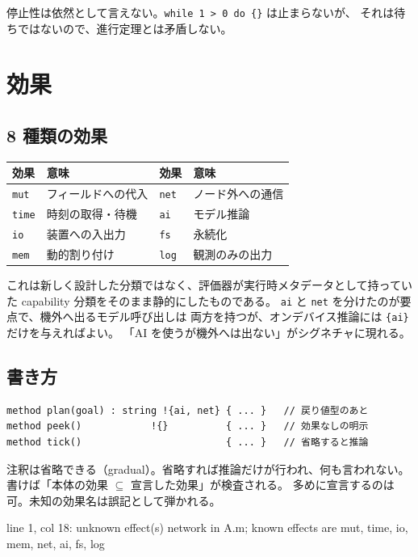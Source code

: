 \documentclass[11pt,a4paper]{ltjsarticle}
\newcommand{\eff}[1]{\texttt{\{#1\}}}
\begin{document}
停止性は依然として言えない。\texttt{while 1 > 0 do \{\}} は止まらないが、
それは待ちではないので、進行定理とは矛盾しない。

\section{効果}
\label{sec:effects}

\subsection{8 種類の効果}

\begin{center}
\begin{tabular}{@{}llll@{}}
\toprule
効果 & 意味 & 効果 & 意味 \\
\midrule
\texttt{mut}  & フィールドへの代入   & \texttt{net} & ノード外への通信 \\
\texttt{time} & 時刻の取得・待機     & \texttt{ai}  & モデル推論 \\
\texttt{io}   & 装置への入出力       & \texttt{fs}  & 永続化 \\
\texttt{mem}  & 動的割り付け         & \texttt{log} & 観測のみの出力 \\
\bottomrule
\end{tabular}
\end{center}

これは新しく設計した分類ではなく、評価器が実行時メタデータとして持っていた
capability 分類をそのまま静的にしたものである。
\texttt{ai} と \texttt{net} を分けたのが要点で、機外へ出るモデル呼び出しは
両方を持つが、オンデバイス推論には \eff{ai} だけを与えればよい。
「AI を使うが機外へは出ない」がシグネチャに現れる。

\subsection{書き方}

\begin{lstlisting}
method plan(goal) : string !{ai, net} { ... }   // 戻り値型のあと
method peek()            !{}          { ... }   // 効果なしの明示
method tick()                         { ... }   // 省略すると推論
\end{lstlisting}

注釈は省略できる（gradual）。省略すれば推論だけが行われ、何も言われない。
書けば「本体の効果 $\subseteq$ 宣言した効果」が検査される。
多めに宣言するのは可。未知の効果名は誤記として弾かれる。

\begin{term}
 line 1, col 18: unknown effect(s) network in A.m;
  known effects are mut, time, io, mem, net, ai, fs, log
\end{term}
\end{document}
